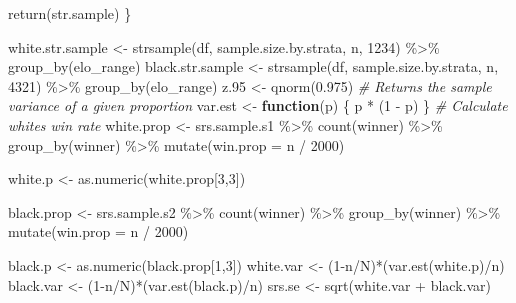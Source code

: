 \documentclass[11pt,]{article}
\newenvironment{Shaded}{\begin{snugshade}}{\end{snugshade}}
\newcommand{\AttributeTok}[1]{\textcolor[rgb]{0.77,0.63,0.00}{#1}}
\newcommand{\CommentTok}[1]{\textcolor[rgb]{0.56,0.35,0.01}{\textit{#1}}}
\newcommand{\ControlFlowTok}[1]{\textcolor[rgb]{0.13,0.29,0.53}{\textbf{#1}}}
\newcommand{\DecValTok}[1]{\textcolor[rgb]{0.00,0.00,0.81}{#1}}
\newcommand{\FloatTok}[1]{\textcolor[rgb]{0.00,0.00,0.81}{#1}}
\newcommand{\FunctionTok}[1]{\textcolor[rgb]{0.00,0.00,0.00}{#1}}
\newcommand{\NormalTok}[1]{#1}
\newcommand{\OtherTok}[1]{\textcolor[rgb]{0.56,0.35,0.01}{#1}}
\newcommand{\SpecialCharTok}[1]{\textcolor[rgb]{0.00,0.00,0.00}{#1}}
\begin{document}
\begin{Shaded}
\begin{Highlighting}[]
  \FunctionTok{return}\NormalTok{(str.sample)}
\NormalTok{\}}

\NormalTok{white.str.sample }\OtherTok{\textless{}{-}} \FunctionTok{strsample}\NormalTok{(df, sample.size.by.strata, n, }\DecValTok{1234}\NormalTok{) }\SpecialCharTok{\%\textgreater{}\%} 
  \FunctionTok{group\_by}\NormalTok{(elo\_range) }
\NormalTok{black.str.sample }\OtherTok{\textless{}{-}} \FunctionTok{strsample}\NormalTok{(df, sample.size.by.strata, n, }\DecValTok{4321}\NormalTok{) }\SpecialCharTok{\%\textgreater{}\%} 
  \FunctionTok{group\_by}\NormalTok{(elo\_range) }
\NormalTok{z}\FloatTok{.95} \OtherTok{\textless{}{-}} \FunctionTok{qnorm}\NormalTok{(}\FloatTok{0.975}\NormalTok{)}
\CommentTok{\# Returns the sample variance of a given proportion}
\NormalTok{var.est }\OtherTok{\textless{}{-}} \ControlFlowTok{function}\NormalTok{(p) \{}
\NormalTok{  p }\SpecialCharTok{*}\NormalTok{ (}\DecValTok{1} \SpecialCharTok{{-}}\NormalTok{ p)}
\NormalTok{\}}
\CommentTok{\# Calculate white\textquotesingle{}s win rate}
\NormalTok{white.prop }\OtherTok{\textless{}{-}}\NormalTok{ srs.sample.s1 }\SpecialCharTok{\%\textgreater{}\%}
  \FunctionTok{count}\NormalTok{(winner) }\SpecialCharTok{\%\textgreater{}\%}
  \FunctionTok{group\_by}\NormalTok{(winner) }\SpecialCharTok{\%\textgreater{}\%}
  \FunctionTok{mutate}\NormalTok{(}\AttributeTok{win.prop =}\NormalTok{ n }\SpecialCharTok{/} \DecValTok{2000}\NormalTok{)}

\NormalTok{white.p }\OtherTok{\textless{}{-}} \FunctionTok{as.numeric}\NormalTok{(white.prop[}\DecValTok{3}\NormalTok{,}\DecValTok{3}\NormalTok{])}

\NormalTok{black.prop }\OtherTok{\textless{}{-}}\NormalTok{ srs.sample.s2 }\SpecialCharTok{\%\textgreater{}\%}
  \FunctionTok{count}\NormalTok{(winner) }\SpecialCharTok{\%\textgreater{}\%}
  \FunctionTok{group\_by}\NormalTok{(winner) }\SpecialCharTok{\%\textgreater{}\%}
  \FunctionTok{mutate}\NormalTok{(}\AttributeTok{win.prop =}\NormalTok{ n }\SpecialCharTok{/} \DecValTok{2000}\NormalTok{)}

\NormalTok{black.p }\OtherTok{\textless{}{-}} \FunctionTok{as.numeric}\NormalTok{(black.prop[}\DecValTok{1}\NormalTok{,}\DecValTok{3}\NormalTok{])}
\NormalTok{white.var }\OtherTok{\textless{}{-}}\NormalTok{ (}\DecValTok{1}\SpecialCharTok{{-}}\NormalTok{n}\SpecialCharTok{/}\NormalTok{N)}\SpecialCharTok{*}\NormalTok{(}\FunctionTok{var.est}\NormalTok{(white.p)}\SpecialCharTok{/}\NormalTok{n)}
\NormalTok{black.var }\OtherTok{\textless{}{-}}\NormalTok{ (}\DecValTok{1}\SpecialCharTok{{-}}\NormalTok{n}\SpecialCharTok{/}\NormalTok{N)}\SpecialCharTok{*}\NormalTok{(}\FunctionTok{var.est}\NormalTok{(black.p)}\SpecialCharTok{/}\NormalTok{n)}
\NormalTok{srs.se }\OtherTok{\textless{}{-}} \FunctionTok{sqrt}\NormalTok{(white.var }\SpecialCharTok{+}\NormalTok{ black.var)}
\end{Highlighting}
\end{Shaded}
\end{document}
